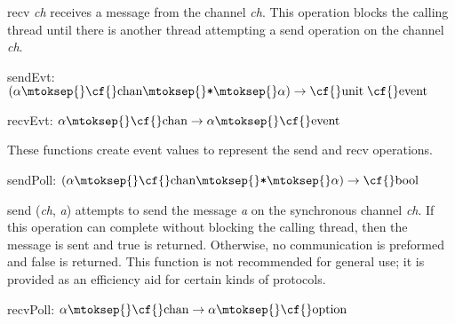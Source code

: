 \begin{descr}
\begin{speccomment}
\item {\cf \small recv \mbox{\cf \small \textit{ch}}           } 
receives a message from the channel \mbox{\cf \small \textit{ch}}. 	  This operation blocks the calling thread until there is another 	  thread attempting a {\cf \small send} operation on the channel \mbox{\cf \small \textit{ch}}.     \end{speccomment}
\item {}{} {\cf sendEvt: \((\alpha\mtoksep{}\mbox{\cf{}chan}\mtoksep{}\verb,*,\mtoksep{}\alpha)\rightarrow \mbox{\cf{}unit}\;\mbox{\cf{}event}\)}\label{val-CML.sendEvt}

\item {}{} {\cf recvEvt: \(\alpha\mtoksep{}\mbox{\cf{}chan}\rightarrow \alpha\mtoksep{}\mbox{\cf{}event}\)}\label{val-CML.recvEvt}


\begin{speccomment}
\item 

	  These functions create event values to represent the {\cf \small send} 	  and {\cf \small recv} operations.     \end{speccomment}
\item {}{} {\cf sendPoll: \((\alpha\mtoksep{}\mbox{\cf{}chan}\mtoksep{}\verb,*,\mtoksep{}\alpha)\rightarrow \mbox{\cf{}bool}\)}\label{val-CML.sendPoll}


\begin{speccomment}
\item {\cf \small send (\mbox{\cf \small \textit{ch}}, \mbox{\cf \small \textit{a}})           } 
attempts to send the message \mbox{\cf \small \textit{a}} on the synchronous channel \mbox{\cf \small \textit{ch}}. 	  If this operation can complete without blocking the calling thread, then 	  the message is sent and {\cf \small true} is returned. 	  Otherwise, no communication is preformed and {\cf \small false} is returned. 	  This function is not recommended for general use; it is provided 	  as an efficiency aid for certain kinds of protocols.     \end{speccomment}
\item {}{} {\cf recvPoll: \(\alpha\mtoksep{}\mbox{\cf{}chan}\rightarrow \alpha\mtoksep{}\mbox{\cf{}option}\)}\label{val-CML.recvPoll}



\end{descr}
